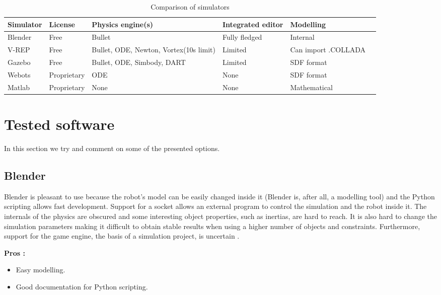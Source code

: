 \begin{table}[htp]
\center
\begin{tabularx}{\textwidth}{@{} l l X X X X @{}}
\toprule
\textbf{Simulator} & \textbf{License} & \textbf{Physics engine(s)} & \textbf{Integrated editor} & \textbf{Modelling}\\ 
\midrule
Blender & Free & Bullet & Fully fledged & Internal\\ 

V-REP & Free & Bullet, ODE, Newton, Vortex(10s limit) & Limited & Can import .COLLADA\\

Gazebo & Free & Bullet, ODE, Simbody, DART & Limited & SDF format\\

Webots & Proprietary & ODE & None & SDF format\\

Matlab & Proprietary & None & None & Mathematical\\
\bottomrule
\end{tabularx}
\caption{Comparison of simulators}
\label{table:simulators_comp}
\end{table}

\section{Tested software}
In this section we try and comment on some of the presented options.
\subsection{Blender}
Blender is pleasant to use because the robot's model can be easily changed inside it (Blender is, after all, a modelling tool) and the Python scripting allows fast development. Support for a socket allows an external program to control the simulation and the robot inside it. The internals of the physics are obscured and some interesting object properties, such as inertias, are hard to reach. It is also hard to change the simulation parameters making it difficult to obtain stable results when using a higher number of objects and constraints. Furthermore, support for the game engine, the basis of a simulation project, is uncertain \cite{blender_roadmap}.

\textbf{Pros :}
\begin{itemize}
\item Easy modelling.
\item Good documentation for Python scripting.
\end{itemize}

